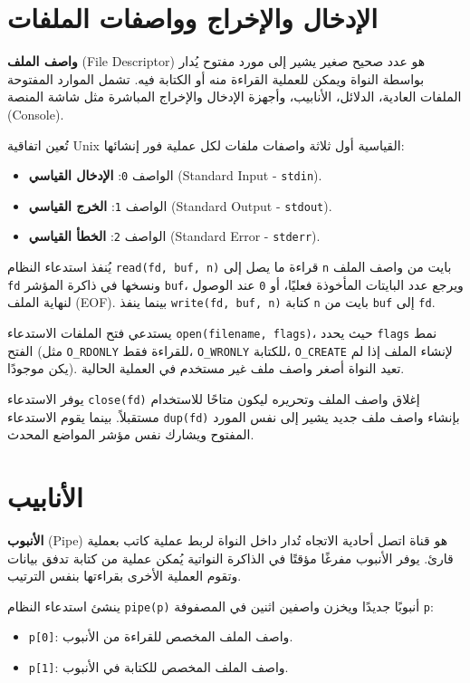 \section{الإدخال والإخراج وواصفات الملفات}
\label{sec:io_fds}

\textbf{واصف الملف} (File Descriptor) هو عدد صحيح صغير يشير إلى مورد مفتوح يُدار بواسطة النواة ويمكن للعملية القراءة منه أو الكتابة فيه. تشمل الموارد المفتوحة الملفات العادية، الدلائل، الأنابيب، وأجهزة الإدخال والإخراج المباشرة مثل شاشة المنصة (Console).

تُعين اتفاقية Unix القياسية أول ثلاثة واصفات ملفات لكل عملية فور إنشائها:
\begin{itemize}
  \item الواصف \texttt{0}: \textbf{الإدخال القياسي} (Standard Input - \texttt{stdin}).
  \item الواصف \texttt{1}: \textbf{الخرج القياسي} (Standard Output - \texttt{stdout}).
  \item الواصف \texttt{2}: \textbf{الخطأ القياسي} (Standard Error - \texttt{stderr}).
\end{itemize}

يُنفذ استدعاء النظام \texttt{read(fd, buf, n)} قراءة ما يصل إلى \texttt{n} بايت من واصف الملف \texttt{fd} ونسخها في ذاكرة المؤشر \texttt{buf}، ويرجع عدد البايتات المأخوذة فعليًا، أو \texttt{0} عند الوصول لنهاية الملف (EOF). بينما ينفذ \texttt{write(fd, buf, n)} كتابة \texttt{n} بايت من \texttt{buf} إلى \texttt{fd}.

يستدعي فتح الملفات الاستدعاء \texttt{open(filename, flags)}، حيث يحدد \texttt{flags} نمط الفتح (مثل \texttt{O\_RDONLY} للقراءة فقط، \texttt{O\_WRONLY} للكتابة، \texttt{O\_CREATE} لإنشاء الملف إذا لم يكن موجودًا). تعيد النواة أصغر واصف ملف غير مستخدم في العملية الحالية.

يوفر الاستدعاء \texttt{close(fd)} إغلاق واصف الملف وتحريره ليكون متاحًا للاستخدام مستقبلاً. بينما يقوم الاستدعاء \texttt{dup(fd)} بإنشاء واصف ملف جديد يشير إلى نفس المورد المفتوح ويشارك نفس مؤشر المواضع المحدث.

\section{الأنابيب}
\label{sec:pipes}

\textbf{الأنبوب} (Pipe) هو قناة اتصل أحادية الاتجاه تُدار داخل النواة لربط عملية كاتب بعملية قارئ. يوفر الأنبوب مفرغًا مؤقتًا في الذاكرة النواتية يُمكن عملية من كتابة تدفق بيانات وتقوم العملية الأخرى بقراءتها بنفس الترتيب.

ينشئ استدعاء النظام \texttt{pipe(p)} أنبوبًا جديدًا ويخزن واصفين اثنين في المصفوفة \texttt{p}:
\begin{itemize}
  \item \texttt{p[0]}: واصف الملف المخصص للقراءة من الأنبوب.
  \item \texttt{p[1]}: واصف الملف المخصص للكتابة في الأنبوب.
\end{itemize}

